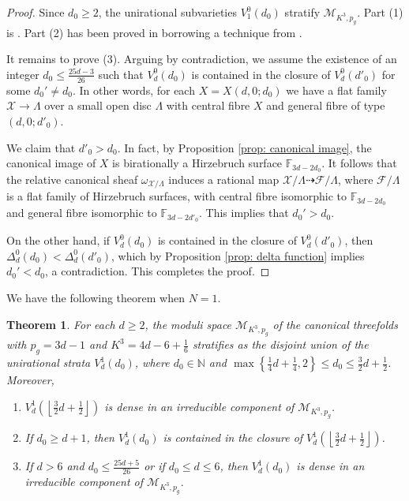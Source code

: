 \documentclass[a4paper,11pt]{amsart}
\newcommand{\M}{\ensuremath{\mathcal{M}}}
\newcommand{\FF}{\ensuremath{\mathbb{F}}}
\newcommand{\NN}{\ensuremath{\mathbb{N}}}
\newtheorem{thm}{Theorem}[section]
\theoremstyle{definition}
\theoremstyle{remark}
\numberwithin{equation}{section}
\begin{document}
\begin{proof}
	Since $d_0 \ge 2$, the unirational subvarieties $V^0_1(d_0)$ stratify $\M_{K^3, p_g}$. Part (1) is \cite[Proposition 2.2]{CP}. Part (2) has been proved in \cite[Proposition 2.2 and 2.4]{CP} borrowing a technique from \cite{Pignatelli}.
	
	It remains to prove (3). Arguing by contradiction, we assume the existence of an integer $d_0 \le \frac{25d-3}{26}$  such that $V^0_d (d_0)$ is contained in the closure of $V^0_d (d'_0) $ for some $d_0' \neq d_0$. In other words, for each $X = X(d, 0; d_0)$ we have a flat family $\mathcal {X} \rightarrow \Lambda$ over a small open disc $\Lambda$ with central fibre $X$ and general fibre of type $(d, 0; d'_0)$.
	
	We claim that $d'_0 > d_0$. In fact, by Proposition \ref{prop: canonical image}, the canonical image of $X$ is birationally a Hirzebruch surface $\FF_{3d-2d_0}$. It follows that the relative canonical sheaf $\omega_{{\mathcal X}/\Lambda}$ induces a rational map ${\mathcal X}/\Lambda \dashrightarrow {\mathcal F}/\Lambda$, where ${\mathcal F}/\Lambda$ is a flat family of Hirzebruch surfaces, with central fibre isomorphic to ${\mathbb F}_{3d-2d_0}$ and general fibre isomorphic to ${\mathbb F}_{3d-2d'_0}$. This implies that $d_0' > d_0$.
	
	On the other hand, if $V^0_d(d_0)$ is contained in the closure of $V^0_d(d'_0)$, then $\Delta^0_d(d_0) < \Delta^0_d(d'_0)$, which by Proposition \ref{prop: delta function} implies $d_0' < d_0$, a contradiction. This completes the proof.
\end{proof}


We have the following theorem when $N = 1$.

\begin{thm} \label{thm: moduli N=1}
	For each $d \ge 2$, the moduli space $\M_{K^3, p_g}$ of the canonical threefolds with $p_g = 3d - 1$ and $K^3 = 4d - 6 + \frac16$ stratifies as the disjoint union of the unirational strata $V^1_d(d_0)$, where $d_0 \in \NN$ and $\max \left\{ \frac14 d + \frac14, 2 \right\} \le d_0 \le \frac32 d + \frac12$. Moreover,
	\begin{enumerate}
		\item $V^1_d\left( \left\lfloor \frac32 d + \frac12 \right\rfloor \right)$ is dense in an irreducible component of $\M_{K^3, p_g}$.
		\item If $d_0 \ge d + 1$, then $V^1_d(d_0)$ is contained in the closure of $V^1_d \left(\left\lfloor \frac32 d + \frac12 \right\rfloor \right)$.
		\item If $d > 6$ and $d_0 \le \frac{25d + 5}{26}$ or if $d_0 \le d \le 6$, then $V^1_d(d_0)$ is dense in an irreducible component of $\M_{K^3, p_g}$.
	\end{enumerate}
\end{thm}
\end{document}
